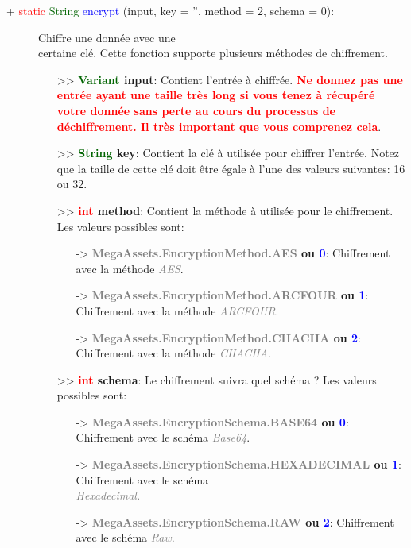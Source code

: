 \documentclass[a4paper, 11pt]{article}
\begin{document}
	\begin{description}
		\item [+ \textcolor{red}{static} \textcolor{darkgreen}{String} \textcolor{blue}{encrypt} (input, key 
		= '', method = 2, schema = 0):] Chiffre une donnée avec une \\certaine clé. Cette fonction supporte 
		plusieurs méthodes de chiffrement.
		\begin{itemize}
			\item [>> \textbf{\textcolor{darkgreen}{Variant} input}:] Contient l'entrée à chiffrée.
			\textbf{\textcolor{red}{Ne donnez pas une entrée ayant une taille très long si vous tenez à 
			récupéré votre donnée sans perte au cours du processus de \\déchiffrement. Il très important que 
			vous comprenez cela}}.
			\item [>> \textbf{\textcolor{darkgreen}{String} key}:] Contient la clé à utilisée pour chiffrer
			l'entrée. Notez que la taille de cette clé doit être égale à l'une des valeurs suivantes: 16 ou 
			32.
			\item [>> \textbf{\textcolor{red}{int} method}:] Contient la méthode à utilisée pour le 
			chiffrement. Les valeurs possibles sont:
			\begin{itemize}
				\item [-> \textbf{\textcolor{gray}{MegaAssets.EncryptionMethod.AES} ou \textcolor{blue}
				{0}}:] Chiffrement avec la méthode \textit{\textcolor{gray}{AES}}.
				\item [-> \textbf{\textcolor{gray}{MegaAssets.EncryptionMethod.ARCFOUR} ou \textcolor{blue}
				{1}}:] Chiffrement avec la méthode \textit{\textcolor{gray}{ARCFOUR}}.
				\item [-> \textbf{\textcolor{gray}{MegaAssets.EncryptionMethod.CHACHA} ou \textcolor{blue}
				{2}}:] Chiffrement avec la méthode \textit{\textcolor{gray}{CHACHA}}.
			\end{itemize}
			\item [>> \textbf{\textcolor{red}{int} schema}:] Le chiffrement suivra quel schéma ? Les valeurs 
			possibles sont:
			\begin{itemize}
				\item [-> \textbf{\textcolor{gray}{MegaAssets.EncryptionSchema.BASE64} ou \textcolor{blue}
				{0}}:] Chiffrement avec le schéma \textit{\textcolor{gray}{Base64}}.
				\item [-> \textbf{\textcolor{gray}{MegaAssets.EncryptionSchema.HEXADECIMAL} ou
				\textcolor{blue}{1}}:] Chiffrement avec le schéma \textit{\textcolor{gray}{\\Hexadecimal}}.
				\item [-> \textbf{\textcolor{gray}{MegaAssets.EncryptionSchema.RAW} ou \textcolor{blue}
				{2}}:] Chiffrement avec le schéma \textit{\textcolor{gray}{Raw}}.\\
			\end{itemize}
		\end{itemize}
	\end{description}
\end{document}
